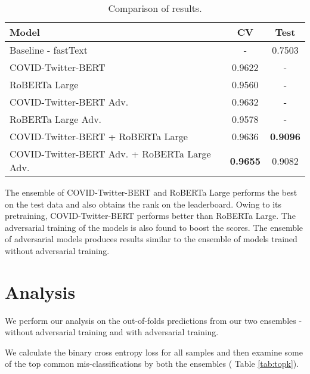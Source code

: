 \documentclass[11pt,a4paper]{article}
\begin{document}
\begin{table}[ht]
\renewcommand\thetable{1}
\centering
\begin{tabular}{|p{4.3cm}|c|c|}
\hline \hspace{1.6cm} \textbf{Model} & \textbf{CV} & \textbf{Test} \\ \hline
Baseline - fastText & - & 0.7503 \\ \hline
COVID-Twitter-BERT & 0.9622 & - \\ \hline
RoBERTa Large & 0.9560 & - \\ \hline
COVID-Twitter-BERT Adv. & 0.9632 & -\\ \hline
RoBERTa Large Adv. & 0.9578 & - \\ \hline
COVID-Twitter-BERT + RoBERTa Large & 0.9636 & {\bf 0.9096} \\ \hline
COVID-Twitter-BERT Adv. + RoBERTa Large Adv. & {\bf 0.9655} & 0.9082 \\ \hline
\end{tabular}
\caption{\label{tab:results} Comparison of results.}
\end{table}




The ensemble of COVID-Twitter-BERT and RoBERTa Large performs the best on the test data and also obtains the  rank on the leaderboard. Owing to its pretraining, COVID-Twitter-BERT performs better than RoBERTa Large. The adversarial training of the models is also found to boost the scores. The ensemble of adversarial models produces results similar to the ensemble of models trained without adversarial training.



\section{Analysis}
\label{sec:error}








We perform our analysis on the out-of-folds predictions from our two ensembles - without adversarial training and with adversarial training.












We calculate the binary cross entropy loss for all samples and then examine some of the top common mis-classifications by both the ensembles ( Table \ref{tab:topk}).
\end{document}
